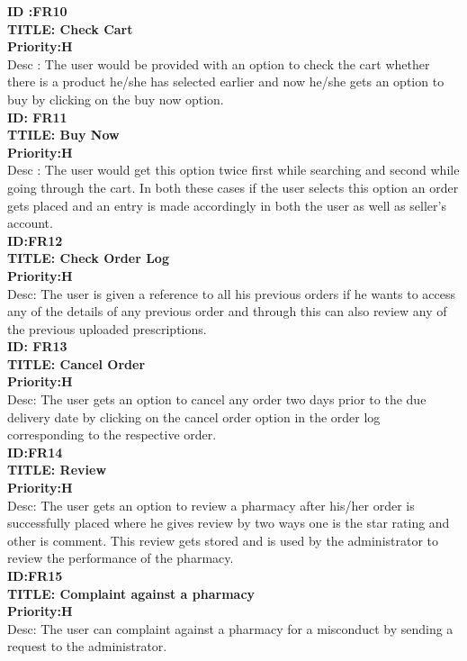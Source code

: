 \documentclass{scrreprt}
\begin{document}
\textbf{ID :FR10}\\
 \textbf{TITLE: Check Cart}\\
 \textbf{Priority:H}\\
Desc : The user would be provided with an option to check the cart whether there is a product he/she has selected earlier and now he/she gets an option to buy by clicking on the buy now option.\\

\textbf{ID: FR11}\\
 \textbf{TTILE: Buy Now}\\
 \textbf{Priority:H}\\
Desc : The user would get this option twice first while searching and second while going through the cart. In both these cases if the user selects this option an order gets placed and an entry is made accordingly in both the user as well as seller’s account.\\

 \textbf{ID:FR12}\\
 \textbf{TITLE: Check Order Log}\\
 \textbf{Priority:H}\\
Desc: The user is given a reference to all his previous orders if he wants to access any of the details of any previous order and through this can also review any of the previous uploaded prescriptions.\\

 \textbf{ID: FR13}\\
 \textbf{TITLE: Cancel Order}\\
 \textbf{Priority:H}\\
Desc: The user gets an option to cancel any order two days prior to the due delivery date by clicking on the cancel order option in the order log corresponding to the respective order.\\

 \textbf{ID:FR14}\\
 \textbf{TITLE: Review}\\
\textbf{Priority:H}\\
Desc: The user gets an option to review a pharmacy after his/her order is successfully placed where he gives review by two ways one is the star rating and other is comment. This review gets stored and is used by the administrator to review the performance of the pharmacy.\\

 \textbf{ID:FR15}\\
 \textbf{TITLE: Complaint against a pharmacy}\\
 \textbf{Priority:H}\\
Desc: The user can complaint against a pharmacy for a misconduct by sending a request to the administrator.\\
\end{document}
